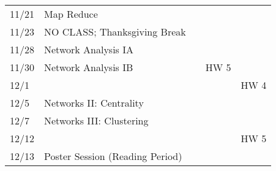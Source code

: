 \documentclass[11pt]{article}
\begin{document}
\begin{centering}
\begin{tabular}{||l|p{3in}|l|l|l||}
11/21 & Map Reduce &  & &\\ 
11/23 & NO CLASS; Thanksgiving Break  & & & \\ 
 \hline

11/28 & Network Analysis IA &  & & \\ 
11/30 & Network Analysis IB &&HW 5 &\\
12/1 &&&& HW 4\\
\hline 
12/5 & Networks II: Centrality & & & \\ 
12/7 & Networks III: Clustering &  &  &\\ 
\hline 
12/12 &&&& HW 5\\
12/13 & Poster Session (Reading Period) &&& \\

\hline\hline


\end{tabular}\\
\end{centering}
\end{document}
